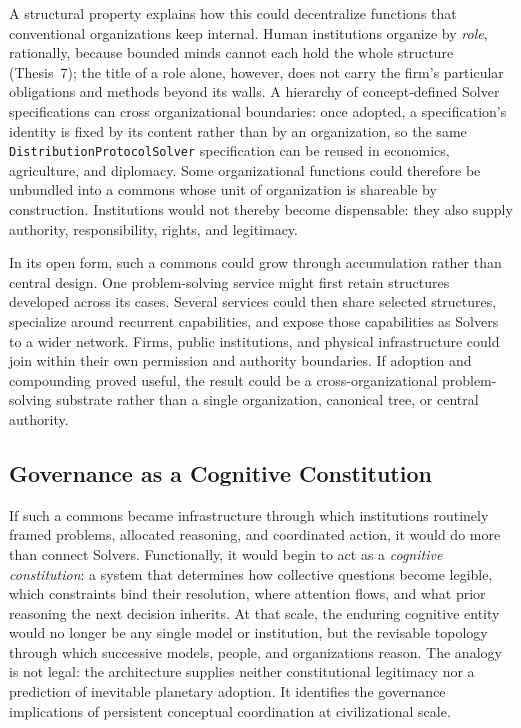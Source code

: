 \documentclass[11pt]{article}
\let\oldtexttt\texttt
\renewcommand{\texttt}[1]{\oldtexttt{\small #1}}
\begin{document}
A structural property explains how this could decentralize functions that conventional organizations keep internal. Human institutions organize by \emph{role}, rationally, because bounded minds cannot each hold the whole structure (Thesis~7); the title of a role alone, however, does not carry the firm's particular obligations and methods beyond its walls. A hierarchy of concept-defined Solver specifications can cross organizational boundaries: once adopted, a specification's identity is fixed by its content rather than by an organization, so the same \texttt{DistributionProtocolSolver} specification can be reused in economics, agriculture, and diplomacy. Some organizational functions could therefore be unbundled into a commons whose unit of organization is shareable by construction. Institutions would not thereby become dispensable: they also supply authority, responsibility, rights, and legitimacy.

In its open form, such a commons could grow through accumulation rather than central design. One problem-solving service might first retain structures developed across its cases. Several services could then share selected structures, specialize around recurrent capabilities, and expose those capabilities as Solvers to a wider network. Firms, public institutions, and physical infrastructure could join within their own permission and authority boundaries. If adoption and compounding proved useful, the result could be a cross-organizational problem-solving substrate rather than a single organization, canonical tree, or central authority.

\subsection{Governance as a Cognitive Constitution}
\label{sec:cognitive-constitution}

If such a commons became infrastructure through which institutions routinely framed problems, allocated reasoning, and coordinated action, it would do more than connect Solvers. Functionally, it would begin to act as a \emph{cognitive constitution}: a system that determines how collective questions become legible, which constraints bind their resolution, where attention flows, and what prior reasoning the next decision inherits. At that scale, the enduring cognitive entity would no longer be any single model or institution, but the revisable topology through which successive models, people, and organizations reason. The analogy is not legal: the architecture supplies neither constitutional legitimacy nor a prediction of inevitable planetary adoption. It identifies the governance implications of persistent conceptual coordination at civilizational scale.
\end{document}
